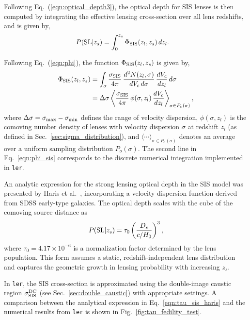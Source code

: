 \documentclass[aps,prd,twocolumn,superscriptaddress,groupedaddress,nofootinbib,showpacs,eqsecnum]{revtex4-1}
\begin{document}
Following Eq.~(\ref{eqn:optical_depth3}), the optical depth for SIS lenses is then computed by integrating the effective lensing cross-section over all lens redshifts, and is given by,
\begin{align}
P({\rm SL}|z_s) &= \int_0^{z_s} \Phi_{\rm SIS}(z_l, z_s) \, dz_l.
\end{align}

Following Eq.~(\ref{eqn:phi}), the function $\Phi_{\rm SIS}(z_l, z_s)$ is given by,
\begin{align}
\Phi_{\rm SIS}(z_l, z_s) &= \int_{\sigma} \frac{\sigma_{\rm SIS}}{4\pi} \, \frac{d^2N(z_l, \sigma)}{dV_c \, d\sigma} \, \frac{dV_c}{dz_l} \, d\sigma \\
                         &= \Delta \sigma \left\langle \frac{\sigma_{\rm SIS}}{4\pi} \, \phi(\sigma, z_l) \, \frac{dV_c}{dz_l} \right\rangle_{\sigma \in P_o(\sigma)},
\label{eqn:phi_sis}\end{align}
where $\Delta \sigma = \sigma_{\rm max} - \sigma_{\rm min}$ defines the range of velocity dispersion, $\phi(\sigma, z_l)$ is the comoving number density of lenses with velocity dispersion $\sigma$ at redshift $z_l$ (as defined in Sec.~\ref{sec:sigma_distribution}), and $\langle \cdots \rangle_{\sigma \in P_o(\sigma)}$ denotes an average over a uniform sampling distribution $P_o(\sigma)$. The second line in Eq.~\eqref{eqn:phi_sis} corresponds to the discrete numerical integration implemented in \texttt{ler}.

An analytic expression for the strong lensing optical depth in the SIS model was presented by Haris et al.~\cite{haris2018}, incorporating a velocity dispersion function derived from SDSS early-type galaxies. The optical depth scales with the cube of the comoving source distance as
\begin{align}
P({\rm SL}|z_s) = \tau_0 \left( \frac{D_s}{c/H_0} \right)^3,
\label{eqn:tau_sis_haris}\end{align}
where $\tau_0 = 4.17 \times 10^{-6}$ is a normalization factor determined by the lens population. This form assumes a static, redshift-independent lens distribution and captures the geometric growth in lensing probability with increasing $z_s$.

In \texttt{ler}, the SIS cross-section is approximated using the double-image caustic region $\sigma^{\rm DC}_{\rm SIS}$ (see Sec.~\ref{sec:double_caustic}) with appropriate settings. A comparison between the analytical expression in Eq.~\eqref{eqn:tau_sis_haris} and the numerical results from \texttt{ler} is shown in Fig.~\ref{fig:tau_fedility_test}.
\end{document}
